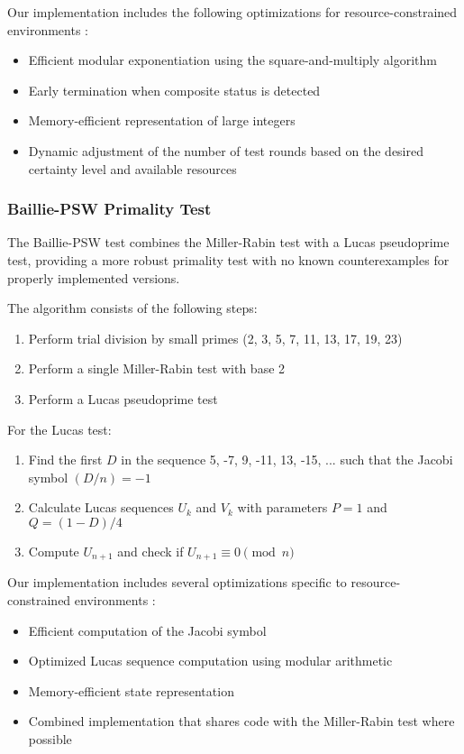 Our implementation includes the following optimizations for resource-constrained environments \cite{energy_efficient}:
\begin{itemize}
    \item Efficient modular exponentiation using the square-and-multiply algorithm
    \item Early termination when composite status is detected
    \item Memory-efficient representation of large integers
    \item Dynamic adjustment of the number of test rounds based on the desired certainty level and available resources
\end{itemize}

\subsubsection{Baillie-PSW Primality Test}
The Baillie-PSW test combines the Miller-Rabin test with a Lucas pseudoprime test, providing a more robust primality test with no known counterexamples for properly implemented versions.

The algorithm consists of the following steps:
\begin{enumerate}
    \item Perform trial division by small primes (2, 3, 5, 7, 11, 13, 17, 19, 23)
    \item Perform a single Miller-Rabin test with base 2
    \item Perform a Lucas pseudoprime test
\end{enumerate}

For the Lucas test:
\begin{enumerate}
    \item Find the first $D$ in the sequence 5, -7, 9, -11, 13, -15, ... such that the Jacobi symbol $(D/n) = -1$
    \item Calculate Lucas sequences $U_k$ and $V_k$ with parameters $P=1$ and $Q=(1-D)/4$
    \item Compute $U_{n+1}$ and check if $U_{n+1} \equiv 0 \pmod{n}$
\end{enumerate}

Our implementation includes several optimizations specific to resource-constrained environments \cite{embedded_benchmarking, energy_efficient}:
\begin{itemize}
    \item Efficient computation of the Jacobi symbol
    \item Optimized Lucas sequence computation using modular arithmetic
    \item Memory-efficient state representation
    \item Combined implementation that shares code with the Miller-Rabin test where possible
\end{itemize}


